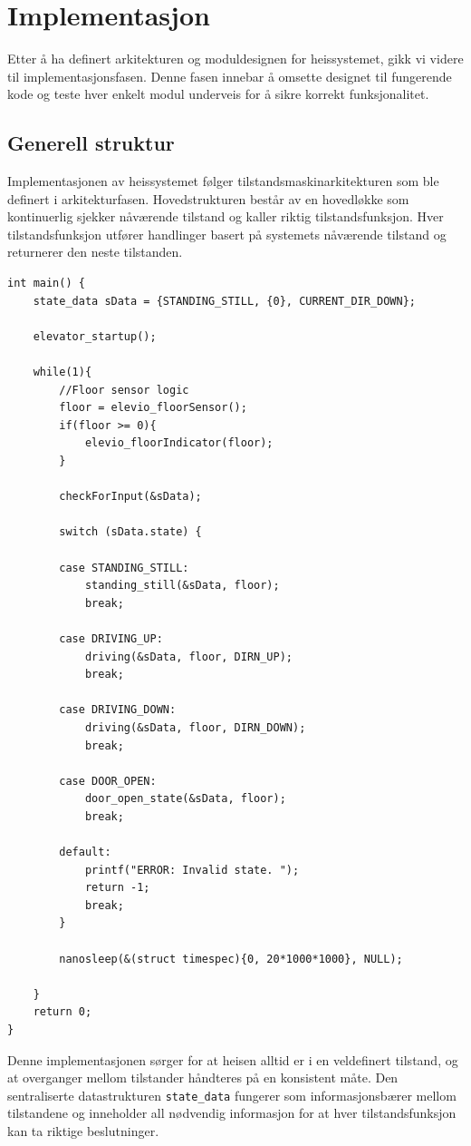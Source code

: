 \chapter{Implementasjon}
Etter å ha definert arkitekturen og moduldesignen for heissystemet, gikk vi videre til implementasjonsfasen. Denne fasen innebar å omsette designet til fungerende kode og teste hver enkelt modul underveis for å sikre korrekt funksjonalitet.

\section{Generell struktur}
Implementasjonen av heissystemet følger tilstandsmaskinarkitekturen som ble definert i arkitekturfasen. Hovedstrukturen består av en hovedløkke som kontinuerlig sjekker nåværende tilstand og kaller riktig tilstandsfunksjon. Hver tilstandsfunksjon utfører handlinger basert på systemets nåværende tilstand og returnerer den neste tilstanden.

\begin{lstlisting}[style=cpp, caption=Hovedløkken i main-filen]
int main() {
    state_data sData = {STANDING_STILL, {0}, CURRENT_DIR_DOWN};

    elevator_startup();

    while(1){
        //Floor sensor logic
        floor = elevio_floorSensor();
        if(floor >= 0){
            elevio_floorIndicator(floor);
        }
        
        checkForInput(&sData);

        switch (sData.state) {

        case STANDING_STILL:
            standing_still(&sData, floor);
            break;

        case DRIVING_UP:
            driving(&sData, floor, DIRN_UP);
            break;

        case DRIVING_DOWN:
            driving(&sData, floor, DIRN_DOWN);
            break;
            
        case DOOR_OPEN:
            door_open_state(&sData, floor);
            break;

        default:
            printf("ERROR: Invalid state. ");
            return -1;
            break;
        }
       
        nanosleep(&(struct timespec){0, 20*1000*1000}, NULL);

    }
    return 0;
}
\end{lstlisting}

Denne implementasjonen sørger for at heisen alltid er i en veldefinert tilstand, og at overganger mellom tilstander håndteres på en konsistent måte. Den sentraliserte datastrukturen \texttt{state\_data} fungerer som informasjonsbærer mellom tilstandene og inneholder all nødvendig informasjon for at hver tilstandsfunksjon kan ta riktige beslutninger.

